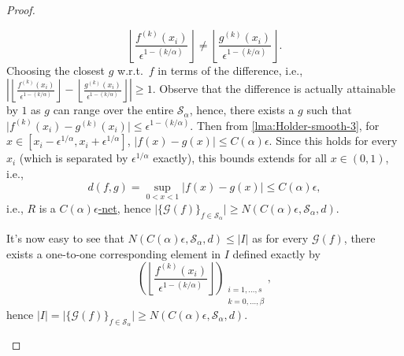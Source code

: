 \begin{proof}
\begin{explanation}
		\[
			\left\lfloor \frac{f^{(k)}(x_i)}{\epsilon ^{1 - (k / \alpha )}} \right\rfloor
			\neq \left\lfloor \frac{g^{(k)}(x_i)}{\epsilon ^{1 - (k / \alpha )}} \right\rfloor.
		\]
		Choosing the closest \(g\) w.r.t.\ \(f\) in terms of the difference, i.e., \(\left\vert \left\lfloor \frac{f^{(k)}(x_i)}{\epsilon ^{1 - (k / \alpha )}} \right\rfloor - \left\lfloor \frac{g^{(k)}(x_i)}{\epsilon ^{1 - (k / \alpha )}} \right\rfloor \right\vert \geq 1\). Observe that the difference is actually attainable by \(1\) as \(g\) can range over the entire \(\mathcal{S} _\alpha \), hence, there exists a \(g\) such that \(\vert f^{(k)}(x_i) - g^{(k)}(x_i) \vert \leq \epsilon ^{1 - (k / \alpha )}\). Then from \autoref{lma:Holder-smooth-3}, for \(x \in [x_i - \epsilon ^{1 / \alpha }, x_i + \epsilon ^{1 / \alpha }]\), \(\vert f(x) - g(x) \vert \leq C(\alpha )\epsilon\). Since this holds for every \(x_i\) (which is separated by \(\epsilon ^{1 / \alpha }\) exactly), this bounds extends for all \(x\in (0, 1)\), i.e.,
		\[
			d (f, g)
			= \sup _{0 < x < 1} \vert f(x) - g(x) \vert
			\leq C(\alpha )\epsilon,
		\]
		i.e., \(R\) is a \hyperref[def:eps-net]{\(C(\alpha )\epsilon \)-net}, hence \(\vert \{ \mathcal{G} (f) \}_{f\in \mathcal{S} _\alpha } \vert \geq N(C(\alpha )\epsilon , \mathcal{S} _\alpha , d )\).

		It's now easy to see that \(N(C(\alpha )\epsilon , \mathcal{S} _\alpha , d ) \leq \vert I \vert \) as for every \(\mathcal{G} (f)\), there exists a one-to-one corresponding element in \(I\) defined exactly by
		\[
			\left( \left\lfloor \frac{f^{(k)}(x_i)}{\epsilon ^{1 - (k / \alpha )}} \right\rfloor \right) _{\substack{i = 1, \dots , s \\ k = 0, \dots , \beta }},
		\]
		hence \(\vert I \vert = \vert \{ \mathcal{G} (f) \}_{f\in \mathcal{S} _\alpha }\vert \geq N(C(\alpha )\epsilon ,\mathcal{S} _\alpha , d )\).
	\end{explanation}


\end{proof}
